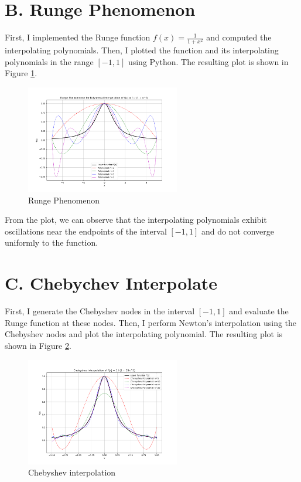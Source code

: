 \documentclass[a4paper]{article}
\begin{document}
\section{B. Runge Phenomenon}
First, I implemented the Runge function \( f(x) = \frac{1}{1 + x^2} \) and computed the interpolating polynomials. Then, I plotted the function and its interpolating polynomials in the range \([-1, 1]\) using Python. The resulting plot is shown in Figure \ref{fig:runge}.
\begin{figure}[ht]
    \centering
    \includegraphics[width=0.6\textwidth]{figures/Runge.png}
    \caption{Runge Phenomenon}
    \label{fig:runge}
\end{figure}

From the plot, we can observe that the interpolating polynomials exhibit oscillations near the endpoints of the interval \([-1, 1]\) and do not converge uniformly to the function.

\section{C. Chebychev Interpolate}
First, I generate the Chebyshev nodes in the interval \([-1, 1]\) and evaluate the Runge function at these nodes. Then, I perform Newton's interpolation using the Chebyshev nodes and plot the interpolating polynomial. The resulting plot is shown in Figure \ref{fig:chebyshev}.
\begin{figure}[ht]
    \centering
    \includegraphics[width=0.6\textwidth]{figures/Chebyshev.png}
    \caption{Chebyshev interpolation}
    \label{fig:chebyshev}
\end{figure}
\end{document}
